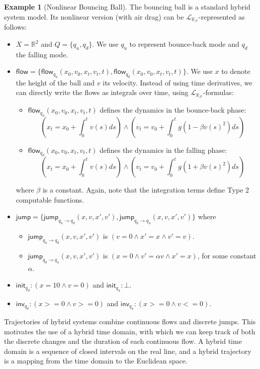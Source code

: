 \documentclass[12pt]{article}
\theoremstyle{plain}
\theoremstyle{definition}
\newtheorem{example}[theorem]{Example}
\newcommand{\flow}{\mathsf{flow}}
\newcommand{\jump}{\mathsf{jump}}
\newcommand{\inv}{\mathsf{inv}}
\newcommand{\init}{\mathsf{init}}
\newcommand{\lrf}{\mathcal{L}_{\mathbb{R}_{\mathcal{F}}}}
\begin{document}
\begin{example}[Nonlinear Bouncing Ball]
The bouncing ball is a standard hybrid system model. Its nonlinear version (with air drag) can be $\lrf$-represented as follows:
\begin{itemize}
\item $X = \mathbb{R}^2$ and $Q = \{q_u, q_d\}$. We use $q_u$ to represent bounce-back mode and $q_d$ the falling mode.
\item $\flow = \{\flow_{q_u}(x_0, v_0, x_t, v_t, t), \flow_{q_d}(x_0, v_0, x_t, v_t, t)\}$. We use $x$ to denote the height of the ball and $v$ its velocity. Instead of using time derivatives, we can directly write the flows as integrals over time, using $\lrf$-formulas:
\begin{itemize}
\item $\flow_{q_u}(x_0, v_0, x_t, v_t, t)$ defines the dynamics in the bounce-back phase:
$$(x_t = x_0 + \int_0^{t} v(s) ds) \wedge (v_t = v_0 + \int_0^t g(1-\beta v(s)^2) ds)$$
\item $\flow_{q_d}(x_0, v_0, x_t, v_t, t)$ defines the dynamics in the falling phase:
$$(x_t = x_0 + \int_0^{t} v(s) ds) \wedge (v_t = v_0 + \int_0^t g(1+\beta v(s)^2) ds)$$
\end{itemize}where
$\beta$ is a constant. Again, note that the integration terms define Type 2 computable functions.
\item $\jump = \{\jump_{q_u \rightarrow q_d} (x, v, x', v'), \jump_{q_d \rightarrow q_u} (x, v, x', v')\}$ where
\begin{itemize}
 \item $\jump_{q_u \rightarrow q_d} (x, v, x', v')$ is $(v= 0 \wedge x' = x \wedge v' = v)$.
\item $\jump_{q_d \rightarrow q_u} (x, v, x', v')$ is $(x= 0 \wedge v' = \alpha v\wedge x'=x)$,  for some constant $\alpha$.
\end{itemize}
\vspace{0.1cm}
\item $\init_{q_d}: (x=10 \wedge v=0)$ and $\init_{q_u}: \bot$.
\item $\inv_{q_d}: (x>=0 \wedge v>=0)$ and $\inv_{q_u}: (x>=0 \wedge v<=0)$.
\end{itemize}
\end{example}

Trajectories of hybrid systems combine continuous flows and discrete jumps. This motivates the use of a hybrid time domain, with which we can keep track of both the discrete changes and the duration of each continuous flow. A hybrid time domain is a sequence of closed intervals on the real line, and a hybrid trajectory is a mapping from the time domain to the Euclidean space.
\end{document}
